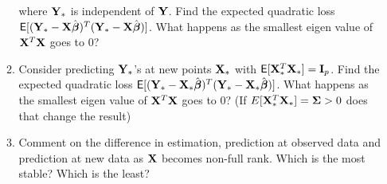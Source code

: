 \documentclass{article}
\begin{document}
\begin{enumerate}
\begin{enumerate}
  where $\mathbf{Y}_*$ is independent of $\mathbf{Y}$.  Find the expected quadratic
  loss $\textsf{E}[(\mathbf{Y}_* - \mathbf{X}\hat{\boldsymbol{\beta}})^T(\mathbf{Y}_* - \mathbf{X}\hat{\boldsymbol{\beta}})]$.  What happens as the
  smallest eigen value of $\mathbf{X}^T\mathbf{X}$ goes to 0?
\item Consider predicting $\mathbf{Y}_*$'s at new points $\mathbf{X}_*$ with
  $\textsf{E}[\mathbf{X}_*^T\mathbf{X}_*] = \mathbf{I}_p$.  Find the expected quadratic loss
  $\textsf{E}[(\mathbf{Y}_* - \mathbf{X}_*\hat{\boldsymbol{\beta}})^T(\mathbf{Y}_* - \mathbf{X}_*\hat{\boldsymbol{\beta}})]$.  What
  happens as the smallest eigen value of $\mathbf{X}^T\mathbf{X}$ goes to 0?  (If
  $E[\mathbf{X}_*^T\mathbf{X}_*] = \boldsymbol{\Sigma} > 0$ does that change the result)
\item Comment on the difference in estimation, prediction at observed
  data and prediction at new data as $\mathbf{X}$ becomes non-full rank.
  Which is the most stable?  Which is the least?
  \end{enumerate}
\end{enumerate}
\end{document}
